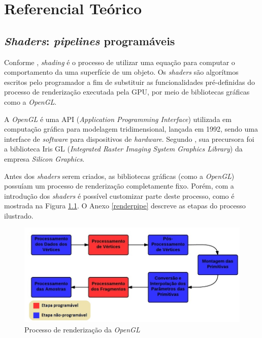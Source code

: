 \chapter[Referencial Teórico]{Referencial Teórico}
\label{refteorico}

\section{\textit{Shaders}: \textit{pipelines} programáveis}

	Conforme \cite{realtime}, \textit{shading} é o processo de utilizar uma equação para computar o comportamento da uma superfície de um objeto. Os \textit{shaders} são algorítmos escritos pelo programador a fim de substituir as funcionalidades pré-definidas do processo de renderização executada pela GPU, por meio de bibliotecas gráficas como a \textit{OpenGL}.

	 A \textit{OpenGL} é uma API (\textit{Application Programming Interface}) utilizada em computação gráfica para modelagem tridimensional, lançada em 1992, sendo uma interface de \textit{software} para dispositivos de \textit{hardware}. Segundo \cite{opengl2011}, sua precursora foi a biblioteca Iris GL (\textit{Integrated Raster Imaging System Graphics Library}) da empresa \textit{Silicon Graphics}.

	Antes dos \textit{shaders} serem criados, as bibliotecas gráficas (como a \textit{OpenGL}) possuíam um processo de renderização completamente fixo. Porém, com a introdução dos \textit{shaders} é possível customizar parte deste processo, como é  mostrada na Figura \ref{pipeline}. O Anexo \ref{renderpipe} descreve as etapas do processo ilustrado.
	\begin{figure}[ht]
	\centering
		\includegraphics[keepaspectratio=true,scale=0.5]{figuras/pipeline.jpg}
	\caption{Processo de renderização da \textit{OpenGL}}
	\label{pipeline}
	\end{figure}

